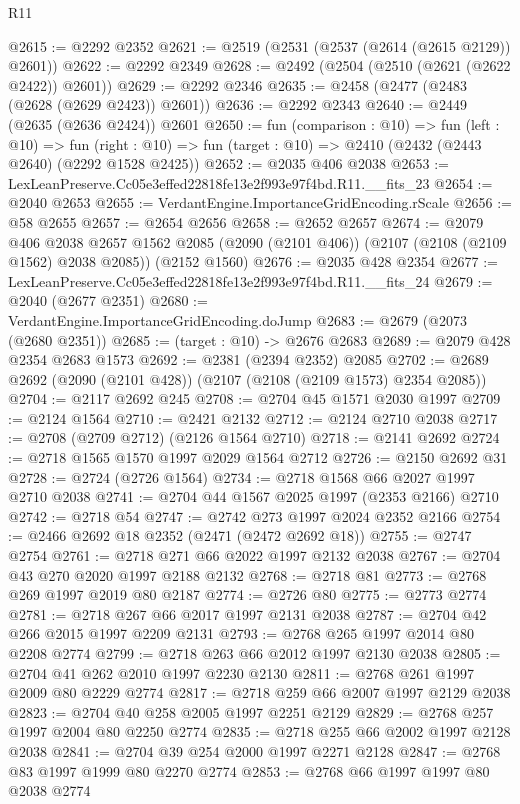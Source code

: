 \begin{lexlean}{R11}
\begin{coremodule}
@2615 := @2292 @2352
@2621 := @2519 (@2531 (@2537 (@2614 (@2615 @2129)) @2601))
@2622 := @2292 @2349
@2628 := @2492 (@2504 (@2510 (@2621 (@2622 @2422)) @2601))
@2629 := @2292 @2346
@2635 := @2458 (@2477 (@2483 (@2628 (@2629 @2423)) @2601))
@2636 := @2292 @2343
@2640 := @2449 (@2635 (@2636 @2424)) @2601
@2650 := fun (comparison : @10) =>
  fun (left : @10) =>
  fun (right : @10) => fun (target : @10) => @2410 (@2432 (@2443 @2640) (@2292 @1528 @2425))
@2652 := @2035 @406 @2038
@2653 := LexLeanPreserve.Cc05e3effed22818fe13e2f993e97f4bd.R11.__fits_23
@2654 := @2040 @2653
@2655 := VerdantEngine.ImportanceGridEncoding.rScale
@2656 := @58 @2655
@2657 := @2654 @2656
@2658 := @2652 @2657
@2674 := @2079
    @406
    @2038
    @2657
    @1562
    @2085
    (@2090 (@2101 @406))
    (@2107 (@2108 (@2109 @1562) @2038 @2085))
    (@2152 @1560)
@2676 := @2035 @428 @2354
@2677 := LexLeanPreserve.Cc05e3effed22818fe13e2f993e97f4bd.R11.__fits_24
@2679 := @2040 (@2677 @2351)
@2680 := VerdantEngine.ImportanceGridEncoding.doJump
@2683 := @2679 (@2073 (@2680 @2351))
@2685 := (target : @10) -> @2676 @2683
@2689 := @2079 @428 @2354 @2683 @1573
@2692 := @2381 (@2394 @2352) @2085
@2702 := @2689 @2692 (@2090 (@2101 @428)) (@2107 (@2108 (@2109 @1573) @2354 @2085))
@2704 := @2117 @2692 @245
@2708 := @2704 @45 @1571 @2030 @1997
@2709 := @2124 @1564
@2710 := @2421 @2132
@2712 := @2124 @2710 @2038
@2717 := @2708 (@2709 @2712) (@2126 @1564 @2710)
@2718 := @2141 @2692
@2724 := @2718 @1565 @1570 @1997 @2029 @1564 @2712
@2726 := @2150 @2692 @31
@2728 := @2724 (@2726 @1564)
@2734 := @2718 @1568 @66 @2027 @1997 @2710 @2038
@2741 := @2704 @44 @1567 @2025 @1997 (@2353 @2166) @2710
@2742 := @2718 @54
@2747 := @2742 @273 @1997 @2024 @2352 @2166
@2754 := @2466 @2692 @18 @2352 (@2471 (@2472 @2692 @18))
@2755 := @2747 @2754
@2761 := @2718 @271 @66 @2022 @1997 @2132 @2038
@2767 := @2704 @43 @270 @2020 @1997 @2188 @2132
@2768 := @2718 @81
@2773 := @2768 @269 @1997 @2019 @80 @2187
@2774 := @2726 @80
@2775 := @2773 @2774
@2781 := @2718 @267 @66 @2017 @1997 @2131 @2038
@2787 := @2704 @42 @266 @2015 @1997 @2209 @2131
@2793 := @2768 @265 @1997 @2014 @80 @2208 @2774
@2799 := @2718 @263 @66 @2012 @1997 @2130 @2038
@2805 := @2704 @41 @262 @2010 @1997 @2230 @2130
@2811 := @2768 @261 @1997 @2009 @80 @2229 @2774
@2817 := @2718 @259 @66 @2007 @1997 @2129 @2038
@2823 := @2704 @40 @258 @2005 @1997 @2251 @2129
@2829 := @2768 @257 @1997 @2004 @80 @2250 @2774
@2835 := @2718 @255 @66 @2002 @1997 @2128 @2038
@2841 := @2704 @39 @254 @2000 @1997 @2271 @2128
@2847 := @2768 @83 @1997 @1999 @80 @2270 @2774
@2853 := @2768 @66 @1997 @1997 @80 @2038 @2774

\end{coremodule}
\end{lexlean}
